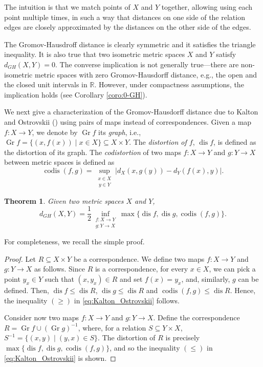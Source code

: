 \documentclass[8pt,a4paper,oneside,english,english]{article}
\theoremstyle{plain}
\theoremstyle
{plain}
\newtheorem{theorem}{Theorem}[section]
\theoremstyle{definition}
\newcommand{\R}{\mathbb{R}}
\newcommand{\GH}{d_{GH}}
\DeclareMathOperator{\dis}{dis}
\DeclareMathOperator{\codis}{codis}
\DeclareMathOperator{\gr}{Gr}
\begin{document}
The intuition is that we match points of $X$ and $Y$ together, allowing using each point multiple times, in such a way that distances on one side of the relation edges are closely approximated by the distances on the other side of the edges.

The Gromov-Hausdroff distance is clearly symmetric and it satisfies the triangle inequality. It is also true that two isometric metric spaces $X$ and $Y$ satisfy $\GH(X,Y)=0$. The converse implication is not generally true---there are non-isometric metric spaces with zero Gromov-Hausdorff distance, e.g., the open and the closed unit intervals in $\R$. However, under compactness assumptions, the implication holds (see Corollary \ref{coro:0-GH}). 

We next give a characterization of the Gromov-Hausdorff distance due to Kalton and Ostrovskii (\cite{KalOst}) using pairs of maps instead of correspondences. Given a map $f\colon X\to Y$, we denote by $\gr f$ its {\em graph}, i.e., $\gr f=\{(x,f(x))\mid x\in X\}\subseteq X\times Y$. The {\em distortion of $f$}, $\dis f$, is defined as the distortion of its graph. The \emph{codistortion} of two maps $f\colon X\to Y$ and $g\colon Y\to X$ between metric spaces is defined as \[
    \codis(f,g)=
    \sup_{\substack{x\in X \\ \,y\in Y}}
    \lvert d_X(x,g(y))-d_Y(f(x),y)\rvert.
\]

\begin{theorem}\label{thm:Kalton_Ostrovskii}
    Given two metric spaces $X$ and $Y$,
    \begin{equation}\label{eq:Kalton_Ostrovskii}
        \GH(X,Y)=\frac{1}{2}\inf_{\substack{f\colon X\to Y\\g\colon Y\to X}}\max\{\dis f,\dis g,\codis(f,g)\}.
    \end{equation}
\end{theorem}
For completeness, we recall the simple proof.
\begin{proof}
    Let $R\subseteq X\times Y$ be a correspondence. We define two maps $f\colon X\to Y$ and $g\colon Y\to X$ as follows. Since $R$ is a correspondence, for every $x\in X$, we can pick a point $y_x\in Y$ such that $(x,y_x)\in R$ and set $f(x)=y_x$, and, similarly, $g$ can be defined. Then, $\dis f\leq\dis R$, $\dis g\leq\dis R$ and $\codis(f,g)\leq\dis R$. Hence, the inequality $(\geq)$ in \eqref{eq:Kalton_Ostrovskii} follows.
    
    Consider now two maps $f\colon X\to Y$ and $g\colon Y\to X$. Define the correspondence $R=\gr f\cup(\gr g)^{-1}$, where, for a relation $S\subseteq Y\times X$, $S^{-1}=\{(x,y)\mid (y,x)\in S\}$. The distortion of $R$ is precisely $\max\{\dis f,\dis g,\codis(f,g)\}$, and so the inequality $(\leq)$ in \eqref{eq:Kalton_Ostrovskii} is shown.
\end{proof}
\end{document}
